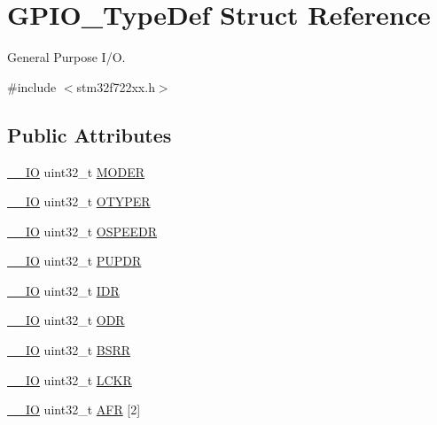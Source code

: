 \hypertarget{struct_g_p_i_o___type_def}{}\section{G\+P\+I\+O\+\_\+\+Type\+Def Struct Reference}
\label{struct_g_p_i_o___type_def}


General Purpose I/O.  




{\ttfamily \#include $<$stm32f722xx.\+h$>$}

\subsection*{Public Attributes}
\begin{DoxyCompactItemize}
\item 
\mbox{\hyperlink{core__sc300_8h_aec43007d9998a0a0e01faede4133d6be}{\+\_\+\+\_\+\+IO}} uint32\+\_\+t \mbox{\hyperlink{struct_g_p_i_o___type_def_ac2505d096b6b650f1647b8e0ff8b196b}{M\+O\+D\+ER}}
\item 
\mbox{\hyperlink{core__sc300_8h_aec43007d9998a0a0e01faede4133d6be}{\+\_\+\+\_\+\+IO}} uint32\+\_\+t \mbox{\hyperlink{struct_g_p_i_o___type_def_a910885e4d881c3a459dd11640237107f}{O\+T\+Y\+P\+ER}}
\item 
\mbox{\hyperlink{core__sc300_8h_aec43007d9998a0a0e01faede4133d6be}{\+\_\+\+\_\+\+IO}} uint32\+\_\+t \mbox{\hyperlink{struct_g_p_i_o___type_def_a0d233d720f18ae2050f9131fa6faf7c6}{O\+S\+P\+E\+E\+DR}}
\item 
\mbox{\hyperlink{core__sc300_8h_aec43007d9998a0a0e01faede4133d6be}{\+\_\+\+\_\+\+IO}} uint32\+\_\+t \mbox{\hyperlink{struct_g_p_i_o___type_def_a44ada3bfbe891e2efc1e06bda4c8014e}{P\+U\+P\+DR}}
\item 
\mbox{\hyperlink{core__sc300_8h_aec43007d9998a0a0e01faede4133d6be}{\+\_\+\+\_\+\+IO}} uint32\+\_\+t \mbox{\hyperlink{struct_g_p_i_o___type_def_acf11156409414ad8841bb0b62959ee96}{I\+DR}}
\item 
\mbox{\hyperlink{core__sc300_8h_aec43007d9998a0a0e01faede4133d6be}{\+\_\+\+\_\+\+IO}} uint32\+\_\+t \mbox{\hyperlink{struct_g_p_i_o___type_def_a6fb78f4a978a36032cdeac93ac3c9c8b}{O\+DR}}
\item 
\mbox{\hyperlink{core__sc300_8h_aec43007d9998a0a0e01faede4133d6be}{\+\_\+\+\_\+\+IO}} uint32\+\_\+t \mbox{\hyperlink{struct_g_p_i_o___type_def_acd6f21e08912b484c030ca8b18e11cd6}{B\+S\+RR}}
\item 
\mbox{\hyperlink{core__sc300_8h_aec43007d9998a0a0e01faede4133d6be}{\+\_\+\+\_\+\+IO}} uint32\+\_\+t \mbox{\hyperlink{struct_g_p_i_o___type_def_a95a59d4b1d52be521f3246028be32f3e}{L\+C\+KR}}
\item 
\mbox{\hyperlink{core__sc300_8h_aec43007d9998a0a0e01faede4133d6be}{\+\_\+\+\_\+\+IO}} uint32\+\_\+t \mbox{\hyperlink{struct_g_p_i_o___type_def_a2245603433e102f0fd8a85f7de020755}{A\+FR}} \mbox{[}2\mbox{]}
\end{DoxyCompactItemize}


